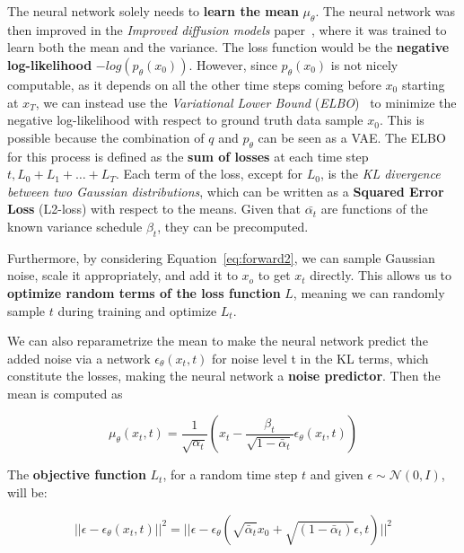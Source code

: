\documentclass[preprint]{elsarticle}
\begin{document}
The neural network solely needs to \textbf{learn the mean} $\mu_\theta$.
The neural network was then improved in the \emph{Improved diffusion models} paper~\cite{nichol2021improved}, where it was trained to learn both the mean and the variance.
The loss function would be the \textbf{negative log-likelihood} $-log(p_\theta(x_0))$. 
However, since $p_\theta(x_0)$ is not nicely computable, as it depends on all the other time steps coming before  $x_0$ starting at $x_T$, we can instead use the \emph{Variational Lower Bound} (\emph{ELBO})~\cite{elbo} 
to minimize the negative log-likelihood with respect to ground truth data sample $x_0$.
This is possible because the combination of $q$ and $p_\theta$ can be seen as a VAE.
The ELBO for this process is defined as the \textbf{sum of losses} at each time step $t, L_0 + L_1 + \dots + L_T$.
Each term of the loss, except for $L_0$, is the \emph{KL divergence between two Gaussian distributions},
which can be written as a \textbf{Squared Error Loss} (L2-loss) with respect to the means.
Given that $\bar{\alpha_t}$ are functions of the known variance schedule $\beta_t$, they can be precomputed.

Furthermore, by considering Equation~\ref{eq:forward2}, we can sample Gaussian noise, 
scale it appropriately, and add it to $x_o$ to  get $x_t$ directly. This allows us
to \textbf{optimize random terms of the loss function} $L$, meaning we can randomly sample $t$ during training and optimize $L_t$.

We can also reparametrize the mean to make the neural network predict
the added noise via a network $\epsilon_\theta(x_t,t)$ for noise level t in the KL terms, which
constitute the losses, making the neural network a \textbf{noise predictor}.
Then the mean is computed as \cite{weng2021diffusion}

\begin{equation}
	\mu_\theta(x_t,t) =\frac{1}{\sqrt{\alpha_t}}\left(x_t - \frac{\beta_t}{\sqrt{1-\bar{\alpha}_t}}\epsilon_\theta(x_t,t)\right)
\end{equation}

The \textbf{objective function} $L_t$, for a random time step $t$ and given $\epsilon \sim \mathcal{N}(0,I)$, will be:

\begin{equation}
	||\epsilon-\epsilon_\theta(x_t,t)||^2 = ||\epsilon - \epsilon_\theta
	(\sqrt{\bar{\alpha}_t}x_0 + \sqrt{(1-\bar{\alpha}_t)}\epsilon,t) ||^2
\end{equation}
\end{document}
